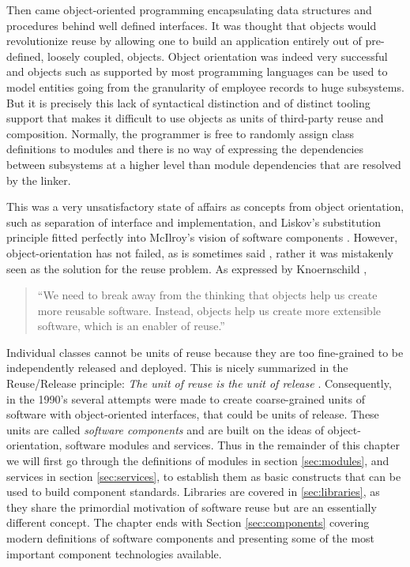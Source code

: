 Then came object-oriented programming encapsulating data structures and procedures behind well defined interfaces. It was thought that
objects would revolutionize reuse by allowing one to build an application entirely out of pre-defined, loosely coupled, objects. 
Object orientation was indeed very successful and objects such as supported by most programming languages can be used to model
entities going from the granularity of employee records to huge subsystems. But it is precisely this lack of syntactical distinction and
of distinct tooling support that makes it difficult to use objects as units of third-party reuse and composition. Normally, the programmer is
free to randomly assign class definitions to modules and there is no way of expressing the dependencies between subsystems
at a higher level than module dependencies that are resolved by the linker.

This was a very unsatisfactory state of affairs as concepts from object orientation, such as separation of interface and implementation,
and Liskov's substitution principle fitted perfectly into McIlroy's vision of software components \cite{Liskov}. However, object-orientation
has not failed, as is sometimes said \cite{Udell}, rather it was mistakenly seen as the solution for the reuse problem. As expressed by Knoernschild
\cite{Knoernschild},

\begin{quotation}
``We need to break away from the thinking that objects help us create more reusable software.
Instead, objects help us create more extensible software, which is an enabler of reuse.''
\end{quotation}

Individual classes cannot be units of reuse because they are too fine-grained to be independently released and deployed. This
is nicely summarized in the Reuse/Release principle: \emph{The unit of reuse is the unit of release} \cite{Martin}.
Consequently, in the 1990's several attempts were made to create coarse-grained units of software with object-oriented interfaces,
that could be units of release. These units are called \emph{software components} and are built on the ideas of object-orientation,
software modules and services. Thus in the remainder of this chapter we will first go through the definitions of modules in section
\ref{sec:modules}, and services in section \ref{sec:services}, to establish them as basic constructs that can be used to build
component standards. Libraries are covered in \ref{sec:libraries}, as they share the primordial motivation of software reuse but
are an essentially different concept. The chapter ends with Section \ref{sec:components} covering modern definitions of software
components and presenting some of the most important component technologies available.


